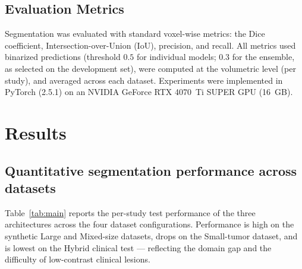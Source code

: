\documentclass[11pt]{article}
\begin{document}
\subsection{Evaluation Metrics}
Segmentation was evaluated with standard voxel-wise metrics: the Dice coefficient,
Intersection-over-Union (IoU), precision, and recall. All metrics used binarized
predictions (threshold $0.5$ for individual models; $0.3$ for the ensemble, as
selected on the development set), were computed at the volumetric level (per study),
and averaged across each dataset. Experiments were implemented in PyTorch (2.5.1) on
an NVIDIA GeForce RTX 4070~Ti SUPER GPU (16~GB).

\section{Results}

\subsection{Quantitative segmentation performance across datasets}
Table~\ref{tab:main} reports the per-study test performance of the three
architectures across the four dataset configurations. Performance is high on the
synthetic Large and Mixed-size datasets, drops on the Small-tumor dataset, and is
lowest on the Hybrid clinical test --- reflecting the domain gap and the difficulty
of low-contrast clinical lesions.
\end{document}
